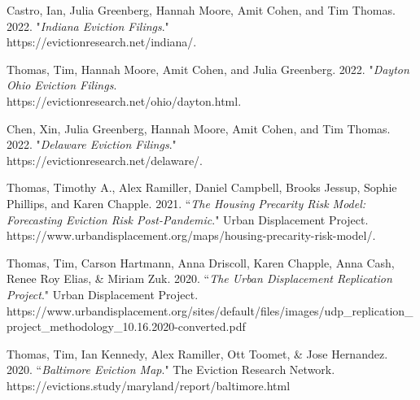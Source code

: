 \begin{cvparagraph}

Castro, Ian, Julia Greenberg, Hannah Moore, Amit Cohen, and Tim Thomas. 2022. "\emph{Indiana Eviction Filings}."\\
https://evictionresearch.net/indiana/.
\end{cvparagraph}

\begin{cvparagraph}

Thomas, Tim, Hannah Moore, Amit Cohen, and Julia Greenberg. 2022. "\emph{Dayton Ohio Eviction Filings}.\\
https://evictionresearch.net/ohio/dayton.html. 
\end{cvparagraph}

\begin{cvparagraph}

Chen, Xin, Julia Greenberg, Hannah Moore, Amit Cohen, and Tim Thomas. 2022. "\emph{Delaware Eviction Filings}."\\
https://evictionresearch.net/delaware/. 
\end{cvparagraph}

\begin{cvparagraph}

Thomas, Timothy A., Alex Ramiller, Daniel Campbell, Brooks Jessup, Sophie Phillips, and Karen Chapple. 2021. “\emph{The Housing Precarity Risk Model: Forecasting Eviction Risk Post-Pandemic}." Urban Displacement Project. https://www.urbandisplacement.org/maps/housing-precarity-risk-model/.
\end{cvparagraph}

\begin{cvparagraph}

Thomas, Tim, Carson Hartmann, Anna Driscoll, Karen Chapple, Anna Cash, Renee Roy Elias, \& Miriam Zuk. 2020. “\emph{The Urban Displacement Replication Project}." Urban Displacement Project.\\
https://www.urbandisplacement.org/sites/default/files/images/udp\_replication\_project\_methodology\_10.16.2020-converted.pdf
\end{cvparagraph}

\begin{cvparagraph}

Thomas, Tim, Ian Kennedy, Alex Ramiller, Ott Toomet, \& Jose Hernandez. 2020. “\emph{Baltimore Eviction Map}." The Eviction Research Network.\\
https://evictions.study/maryland/report/baltimore.html
\end{cvparagraph}

